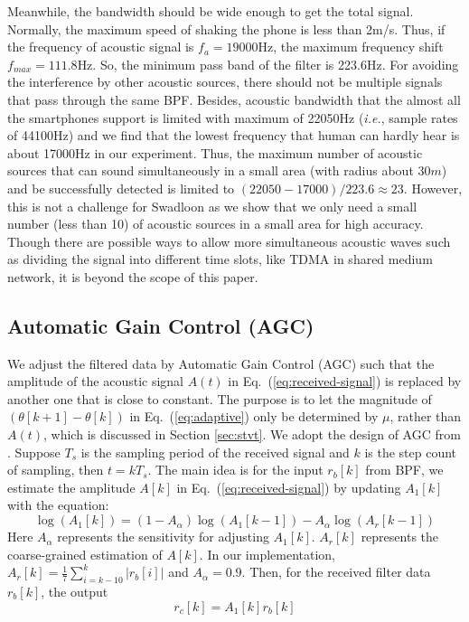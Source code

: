 \documentclass[]{sig-alternate-10pt}
\def\ie{\textit{i.e.}\xspace}
\newcommand{\eqqref}[1]{Eq.~(\ref{#1})}
\def \ourprotocol{Swadloon\xspace}
\begin{document}
Meanwhile, the bandwidth should
be wide enough to get the total signal.  Normally, the maximum speed
of shaking the phone is less than 2m/s.  Thus, if the frequency of
acoustic signal is $f_{a}=19000$Hz, the maximum frequency  
shift $f_{max}=111.8$Hz.  So, the minimum
pass band of the filter is 223.6Hz.  For avoiding the interference by
other acoustic sources, there should not be multiple signals that
pass through the same BPF.  Besides, acoustic bandwidth that the
almost all the smartphones support is limited with maximum of 22050Hz (\ie,
sample rates of 44100Hz) and we find that the lowest frequency that
human can hardly hear is about 17000Hz in our experiment.  Thus, the
maximum number of acoustic sources that can sound simultaneously in
a small area (with radius about $30m$) and be successfully detected
is limited to $(22050-17000)/223.6 \approx 23$. However, this is not
a challenge for \ourprotocol as we show that we only need a small
number (less than 10) of acoustic sources in a small area for high
accuracy.  Though there are possible ways to allow more
simultaneous acoustic waves such as dividing the signal into
different time slots, like TDMA in shared medium network, it is beyond the scope of this paper.


\subsection{Automatic Gain Control (AGC)}
We adjust the filtered data by Automatic Gain Control (AGC) such that
the amplitude of the acoustic signal $A(t)$ in \eqqref{eq:received-signal} is replaced by another one that is close to constant.
The purpose is to let the magnitude of $(\theta[k+1]-\theta[k])$ in
\eqqref{eq:adaptive} only be determined by $\mu$, rather than $A(t)$,  which is discussed in Section \ref{sec:stvt}.
We adopt the design of AGC from \cite{rice2008digital}.  Suppose $T_{s}$ is the sampling period of the received signal and  $k$ is the step count of sampling, then $t=kT_{s}$. The main
idea is for the  input $r_{b}[k]$ from BPF, we estimate the amplitude
$A[k]$ in \eqqref{eq:received-signal} by updating $A_{1}[k]$ with
the equation:
\begin{equation*}
\log(A_{1}[k])=(1-A_\alpha)\log(A_{1}[k-1])-A_\alpha\log(A_{r}[k-1])
\end{equation*}
Here $A_\alpha$ represents the sensitivity for adjusting $A_{1}[k]$. $A_{r}[k]$
represents the coarse-grained estimation of $A[k]$. In our implementation,
 $A_{r}[k]={\textstyle \frac{1}{7}\sum_{i=k-10}^{k}|r_{b}[i]|}$ and $A_\alpha=0.9$.
Then, for the received filter data $r_b[k]$, the output
\begin{equation*}
r_{c}[k]=A_{1}[k]r_{b}[k]
\end{equation*}
\end{document}
